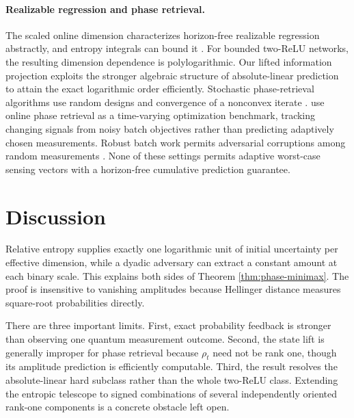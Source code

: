 \documentclass[twoside]{article}
\begin{document}
\paragraph{Realizable regression and phase retrieval.} The scaled online dimension characterizes horizon-free realizable regression abstractly, and entropy integrals can bound it \citep{raman2025unified,doronarad2026online}. For bounded two-ReLU networks, the resulting dimension dependence is polylogarithmic. Our lifted information projection exploits the stronger algebraic structure of absolute-linear prediction to attain the exact logarithmic order efficiently. Stochastic phase-retrieval algorithms use random designs and convergence of a nonconvex iterate \citep{tan2019online}. \citet{bastianello2022opreg} use online phase retrieval as a time-varying optimization benchmark, tracking changing signals from noisy batch objectives rather than predicting adaptively chosen measurements. Robust batch work permits adversarial corruptions among random measurements \citep{huang2023adversarial,buna2025robust}. None of these settings permits adaptive worst-case sensing vectors with a horizon-free cumulative prediction guarantee.

\section{Discussion}

Relative entropy supplies exactly one logarithmic unit of initial uncertainty per effective dimension, while a dyadic adversary can extract a constant amount at each binary scale. This explains both sides of Theorem \ref{thm:phase-minimax}. The proof is insensitive to vanishing amplitudes because Hellinger distance measures square-root probabilities directly.

There are three important limits. First, exact probability feedback is stronger than observing one quantum measurement outcome. Second, the state lift is generally improper for phase retrieval because $\rho_t$ need not be rank one, though its amplitude prediction is efficiently computable. Third, the result resolves the absolute-linear hard subclass rather than the whole two-ReLU class. Extending the entropic telescope to signed combinations of several independently oriented rank-one components is a concrete obstacle left open.



\clearpage
\appendix
\end{document}
